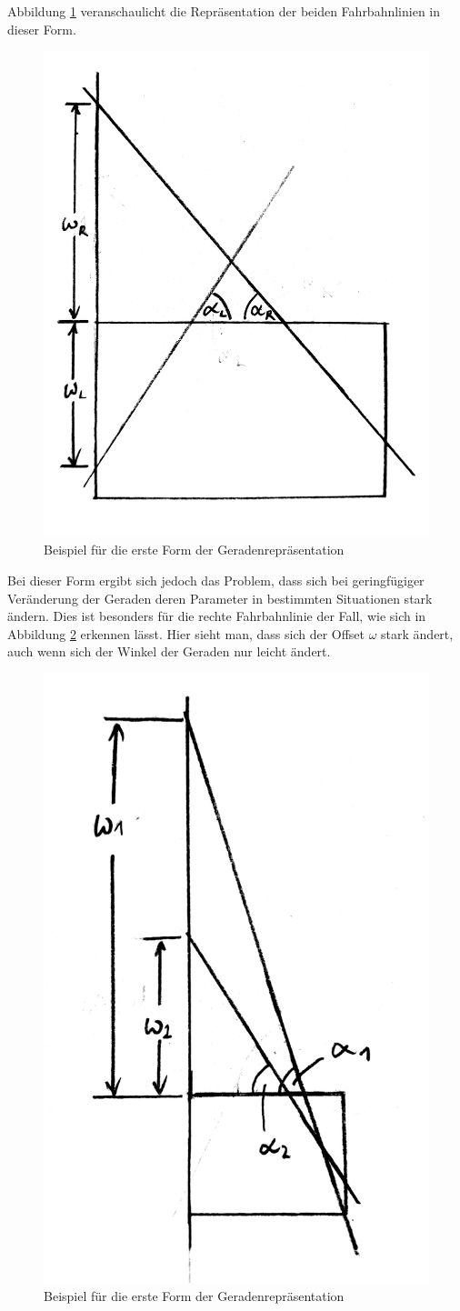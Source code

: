 	Abbildung \ref{fig:alpha_omega1} veranschaulicht die Repräsentation der beiden Fahrbahnlinien in dieser Form.
	
	\begin{figure}[H]
		\centering
		\includegraphics[width=.5\linewidth]{images/alpha_omega1.jpg}
		\caption{Beispiel für die erste Form der Geradenrepräsentation}
		\label{fig:alpha_omega1}
	\end{figure}

	Bei dieser Form ergibt sich jedoch das Problem, dass sich bei geringfügiger Veränderung der Geraden deren Parameter in bestimmten Situationen stark ändern. Dies ist besonders für die rechte Fahrbahnlinie der Fall, wie sich in Abbildung \ref{fig:alpha_omega2} erkennen lässt. Hier sieht man, dass sich der Offset $\omega$ stark ändert, auch wenn sich der Winkel der Geraden nur leicht ändert.


	\begin{figure}[H]
		\centering
		\includegraphics[width=.3\linewidth]{images/alpha_omega2.jpg}
		\caption{Beispiel für die erste Form der Geradenrepräsentation}
		\label{fig:alpha_omega2}
	\end{figure}

